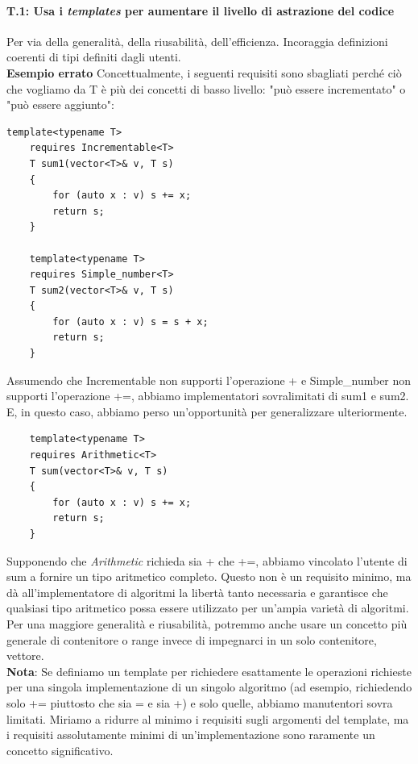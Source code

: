 \paragraph{T.1: Usa i \emph{templates} per aumentare il livello di astrazione del codice}

\textsf{\small Per via della generalità, della riusabilità, dell'efficienza. Incoraggia definizioni coerenti di tipi definiti dagli utenti.} \\

\textsf{\small \textbf{Esempio errato} Concettualmente, i seguenti requisiti sono sbagliati perché ciò che vogliamo da T è più dei concetti di basso livello: "può essere incrementato" o "può essere aggiunto": }

\begin{lstlisting}[frame=single, rulecolor=\color{red}]
	template<typename T>
	requires Incrementable<T>
	T sum1(vector<T>& v, T s)
	{
		for (auto x : v) s += x;
		return s;
	}
	
	template<typename T>
	requires Simple_number<T>
	T sum2(vector<T>& v, T s)
	{
		for (auto x : v) s = s + x;
		return s;
	}
\end{lstlisting}

\textsf{\small Assumendo che Incrementable non supporti l'operazione + e Simple\_number non supporti l'operazione +=, abbiamo implementatori sovralimitati di sum1 e sum2. E, in questo caso, abbiamo perso un'opportunità per generalizzare ulteriormente.}

\begin{lstlisting}
	template<typename T>
	requires Arithmetic<T>
	T sum(vector<T>& v, T s)
	{
		for (auto x : v) s += x;
		return s;
	}
\end{lstlisting}

\textsf{\small Supponendo che \emph{Arithmetic} richieda sia + che +=, abbiamo vincolato l'utente di sum a fornire un tipo aritmetico completo. Questo non è un requisito minimo, ma dà all'implementatore di algoritmi la libertà tanto necessaria e garantisce che qualsiasi tipo aritmetico possa essere utilizzato per un'ampia varietà di algoritmi. Per una maggiore generalità e riusabilità, potremmo anche usare un concetto più generale di contenitore o range invece di impegnarci in un solo contenitore, vettore.} \\

\textsf{\small \textbf{Nota}: Se definiamo un template per richiedere esattamente le operazioni richieste per una singola implementazione di un singolo algoritmo (ad esempio, richiedendo solo += piuttosto che sia = e sia +) e solo quelle, abbiamo manutentori sovra limitati. Miriamo a ridurre al minimo i requisiti sugli argomenti del template, ma i requisiti assolutamente minimi di un'implementazione sono raramente un concetto significativo.} \\

